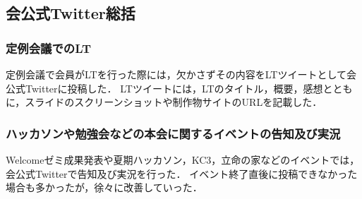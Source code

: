 \subsection*{会公式Twitter総括}


\subsubsection*{定例会議でのLT}
定例会議で会員がLTを行った際には，欠かさずその内容をLTツイートとして会公式Twitterに投稿した．
LTツイートには，LTのタイトル，概要，感想とともに，スライドのスクリーンショットや制作物サイトのURLを記載した．

\subsubsection*{ハッカソンや勉強会などの本会に関するイベントの告知及び実況}
Welcomeゼミ成果発表や夏期ハッカソン，KC3，立命の家などのイベントでは，会公式Twitterで告知及び実況を行った．
イベント終了直後に投稿できなかった場合も多かったが，徐々に改善していった．
